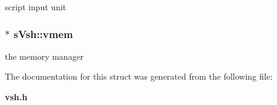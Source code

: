script input unit 

\subsubsection[{vmem}]{$\ast$ s\-Vsh\-::vmem}\label{a00007_a6ff199aeb0841047c1c4cd0a42f3c23a}


the memory manager 



The documentation for this struct was generated from the following file\-:\begin{DoxyCompactItemize}
\item 
{\bf vsh.\-h}\end{DoxyCompactItemize}
